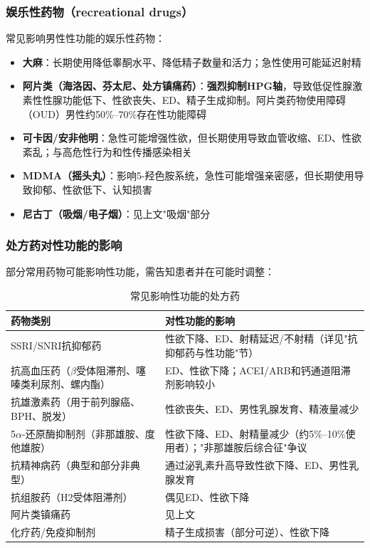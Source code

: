 \begin{enumerate}
\subsubsection{娱乐性药物（recreational drugs）}

常见影响男性性功能的娱乐性药物：

\begin{itemize}[leftmargin=2cm]
	\item \textbf{大麻}：长期使用降低睾酮水平、降低精子数量和活力；急性使用可能延迟射精
	\item \textbf{阿片类（海洛因、芬太尼、处方镇痛药）}：\textbf{强烈抑制HPG轴}，导致低促性腺激素性性腺功能低下、性欲丧失、ED、精子生成抑制。阿片类药物使用障碍（OUD）男性约50\%--70\%存在性功能障碍
	\item \textbf{可卡因/安非他明}：急性可能增强性欲，但长期使用导致血管收缩、ED、性欲紊乱；与高危性行为和性传播感染相关
	\item \textbf{MDMA（摇头丸）}：影响5-羟色胺系统，急性可能增强亲密感，但长期使用导致抑郁、性欲低下、认知损害
	\item \textbf{尼古丁（吸烟/电子烟）}：见上文"吸烟"部分
\end{itemize}

\subsubsection{处方药对性功能的影响}

部分常用药物可能影响性功能，需告知患者并在可能时调整：

\begin{table}[htbp]
\centering
\caption{常见影响性功能的处方药}
\label{tab:drug_sexual_effects}
\begin{tabularx}{\textwidth}{@{}lX@{}}
    \toprule
    \textbf{药物类别} & \textbf{对性功能的影响} \\
    \midrule
    SSRI/SNRI抗抑郁药 & 性欲下降、ED、射精延迟/不射精（详见"抗抑郁药与性功能"节） \\
    抗高血压药（$\beta$受体阻滞剂、噻嗪类利尿剂、螺内酯） & ED、性欲下降；ACEI/ARB和钙通道阻滞剂影响较小 \\
    抗雄激素药（用于前列腺癌、BPH、脱发） & 性欲丧失、ED、男性乳腺发育、精液量减少 \\
    5$\alpha$-还原酶抑制剂（非那雄胺、度他雄胺） & 性欲下降、ED、射精量减少（约5\%--10\%使用者）；"非那雄胺后综合征"争议 \\
    抗精神病药（典型和部分非典型） & 通过泌乳素升高导致性欲下降、ED、男性乳腺发育 \\
    抗组胺药（H2受体阻滞剂） & 偶见ED、性欲下降 \\
    阿片类镇痛药 & 见上文 \\
    化疗药/免疫抑制剂 & 精子生成损害（部分可逆）、性欲下降 \\
    \bottomrule
\end{tabularx}
\end{table}


\end{enumerate}
